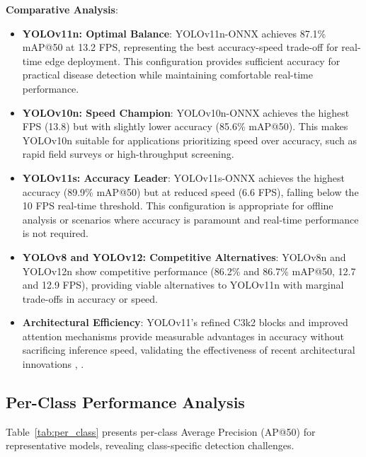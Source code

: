 \textbf{Comparative Analysis}:

\begin{itemize}
\item \textbf{YOLOv11n: Optimal Balance}: YOLOv11n-ONNX achieves 87.1\% mAP@50 at 13.2 FPS, representing the best accuracy-speed trade-off for real-time edge deployment. This configuration provides sufficient accuracy for practical disease detection while maintaining comfortable real-time performance.

\item \textbf{YOLOv10n: Speed Champion}: YOLOv10n-ONNX achieves the highest FPS (13.8) but with slightly lower accuracy (85.6\% mAP@50). This makes YOLOv10n suitable for applications prioritizing speed over accuracy, such as rapid field surveys or high-throughput screening.

\item \textbf{YOLOv11s: Accuracy Leader}: YOLOv11s-ONNX achieves the highest accuracy (89.9\% mAP@50) but at reduced speed (6.6 FPS), falling below the 10 FPS real-time threshold. This configuration is appropriate for offline analysis or scenarios where accuracy is paramount and real-time performance is not required.

\item \textbf{YOLOv8 and YOLOv12: Competitive Alternatives}: YOLOv8n and YOLOv12n show competitive performance (86.2\% and 86.7\% mAP@50, 12.7 and 12.9 FPS), providing viable alternatives to YOLOv11n with marginal trade-offs in accuracy or speed.

\item \textbf{Architectural Efficiency}: YOLOv11's refined C3k2 blocks and improved attention mechanisms provide measurable advantages in accuracy without sacrificing inference speed, validating the effectiveness of recent architectural innovations \cite{4}, \cite{25}.
\end{itemize}

\subsection{Per-Class Performance Analysis}

Table~\ref{tab:per_class} presents per-class Average Precision (AP@50) for representative models, revealing class-specific detection challenges.

